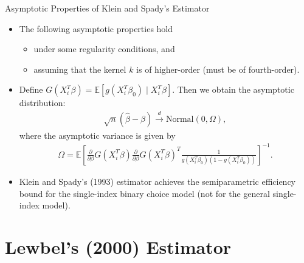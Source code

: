 \documentclass[xcolor=svgnames,dvipdfmx,cjk]{beamer}
\theoremstyle{example}
\def\E{\mathbb{E}}
\def\darrow{\xrightarrow{d}}
\begin{document}
\begin{frame}{Asymptotic Properties of Klein and Spady's Estimator}
\begin{itemize}
  \item The following asymptotic properties hold 
        \begin{itemize}
          \item under some regularity conditions, and
          \item assuming that the kernel $k$ is of higher-order (must be of fourth-order).
        \end{itemize}
  \item Define $G(X_i^T \beta) = \E[g(X_i^T\beta_0)\mid X_i^T\beta]$. 
        Then we obtain the asymptotic distribution:
        \begin{align*}
          \sqrt{n}(\hat{\beta} - \beta) \darrow \text{Normal}(0, \Omega),
        \end{align*}
        where the asymptotic variance is given by 
        \begin{align*}
          \Omega = \E \left[ 
            \frac{\partial}{\partial\beta}G(X_i^T\beta)
            \frac{\partial}{\partial\beta}G(X_i^T\beta)^T
            \frac{1}{g(X_i^T\beta_0)(1-g(X_i^T\beta_0))}
          \right]^{-1}.
        \end{align*}
  \item Klein and Spady's (1993) estimator achieves \alert{the semiparametric efficiency bound for the single-index binary choice model} (not for the general single-index model).
\end{itemize}
\end{frame}

\begin{frame}{}
  
\end{frame}


  
\section{Lewbel's (2000) Estimator}
  
  
  
  
  
  
\end{document}
